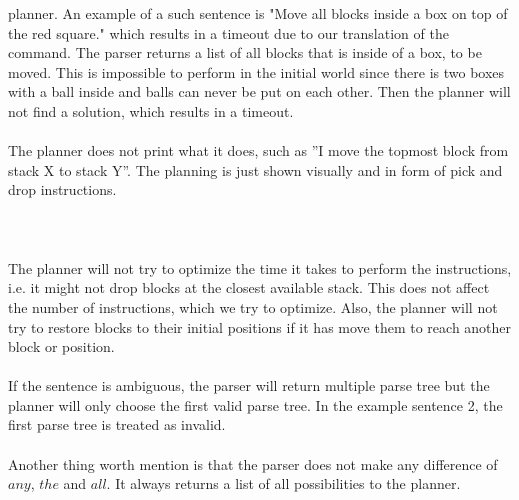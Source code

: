 planner. An example of a such sentence is "Move all blocks inside a box on top
of the red square." which results in a timeout due to our translation of the
command. The parser returns a list of all blocks that is inside of a box, to be
moved. This is impossible to perform in the initial world since there is two
boxes with a ball inside and balls can never be put on each other. Then the
planner will not find a solution, which results in a timeout.\\\\
The planner does not print what it does, such as ''I move the topmost block
from stack X to stack Y''. The planning is just shown visually and in form of
pick and drop instructions. \\\\\\\\
The planner will not try to optimize the time it takes to perform the
instructions, i.e. it might not drop blocks at the closest available stack.
This does not affect the number of instructions, which we try to optimize.
Also, the planner will not try to restore blocks to their initial positions if
it has move them to reach another block or position. 
\\\\
If the sentence is ambiguous, the parser will return multiple parse tree but
the planner will only choose the first valid parse tree. In the example
sentence 2, the first parse tree is treated as invalid. 
\\\\
Another thing worth mention is that the parser does not make any difference of
$any$, $the$ and $all$. It always returns a list of all possibilities to the
planner. 
